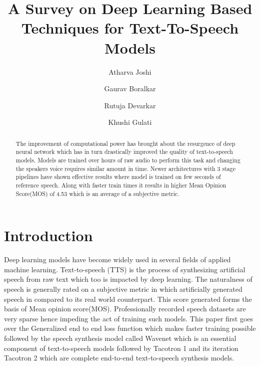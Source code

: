 \documentclass[runningheads]{llncs}
\begin{document}
%
\title{A Survey on Deep Learning Based Techniques for Text-To-Speech
Models}
%
%
\author{Atharva Joshi \and
Gaurav Boralkar \and
Rutuja Devarkar \and
Khushi Gulati}
%
%
%
\maketitle              %
%
\begin{abstract}
The improvement of computational power has
brought about the resurgence of deep neural network which has
in turn drastically improved the quality of text-to-speech models.
Models are trained over hours of raw audio to perform this task
and changing the speakers voice requires similar amount in time.
Newer architectures with 3 stage pipelines have shown effective
results where model is trained on few seconds of reference speech.
Along with faster train times it results in higher Mean Opinion
Score(MOS) of 4.53 which is an average of a subjective metric.


\end{abstract}
%
%
%
\section{Introduction}
Deep learning models have become widely used in several
fields of applied machine learning. Text-to-speech (TTS) is
the process of synthesizing artificial speech from raw text which too
is impacted by deep learning. The naturalness of speech is
generally rated on a subjective metric in which artificially generated speech in compared to its real world counterpart. This
score generated forms the basis of Mean opinion score(MOS).
Professionally recorded speech datasets are very sparse hence
impeding the act of training such models. This paper first goes over the Generalized end to end loss function which makes faster training possible followed by the speech synthesis model called Wavenet
which is an essential component of text-to-speech models followed
by Tacotron 1 and its iteration Tacotron 2 which are complete
end-to-end text-to-speech synthesis models.
\end{document}
